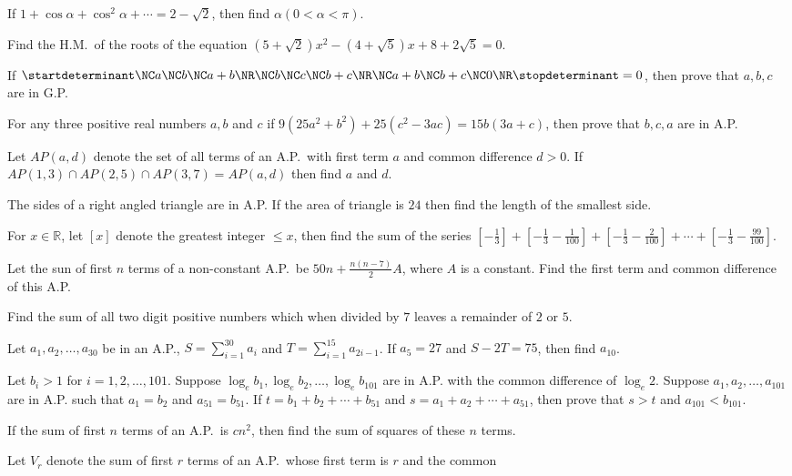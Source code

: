 \item If $1 + \cos\alpha + \cos^2\alpha + \cdots = 2 - \sqrt{2}$, then find $\alpha(0 < \alpha < \pi)$.
\item Find the H.M.\ of the roots of the equation $(5 + \sqrt{2})x^2 - (4 + \sqrt{5})x + 8 + 2\sqrt{5} = 0$.
\item If $\startdeterminant\NC a\NC b\NC a + b\NR\NC b\NC c\NC b + c\NR\NC a + b\NC b + c\NC
  0\NR\stopdeterminant = 0$, then prove that $a, b, c$ are in G.P.
\item For any three positive real numbers $a, b$ and $c$ if $9(25a^2 + b^2) + 25(c^2 - 3ac) = 15b(3a + c)$,
  then prove that $b, c, a$ are in A.P.
\item Let $AP(a, d)$ denote the set of all terms of an A.P.\ with first term $a$ and common difference $d >
  0$. If $AP(1, 3)\cap AP(2, 5)\cap AP(3, 7) = AP(a, d)$ then find $a$ and $d$.
\item The sides of a right angled triangle are in A.P. If the area of triangle is $24$ then find the length
  of the smallest side.
\item For $x\in\mathbb{R}$, let $[x]$ denote the greatest integer $\leq x$, then find the sum of the series
  $\left[-\frac{1}{3}\right] + \left[-\frac{1}{3} - \frac{1}{100}\right] + \left[-\frac{1}{3}
  - \frac{2}{100}\right] + \cdots + \left[-\frac{1}{3} - \frac{99}{100}\right]$.
\item Let the sun of first $n$ terms of a non-constant A.P.\ be $50n + \frac{n(n - 7)}{2}A$, where $A$ is a
  constant. Find the first term and common difference of this A.P.
\item Find the sum of all two digit positive numbers which when divided by $7$ leaves a remainder of $2$ or
  $5$.
\item Let $a_1, a_2, \ldots, a_{30}$ be in an A.P., $S = \displaystyle\sum_{i = 1}^{30}a_i$ and $T
  = \displaystyle\sum_{i = 1}^{15}a_{2i - 1}$. If $a_5 = 27$ and $S - 2T = 75$, then find $a_{10}$.
\item Let $b_i > 1$ for $i = 1, 2, \ldots, 101$. Suppose $\log_eb_1, \log_eb_2, \ldots, \log_eb_{101}$ are
  in A.P. with the common difference of $\log_e2$. Suppose $a_1, a_2, \ldots, a_{101}$ are in A.P. such that
  $a_1 = b_2$ and $a_{51} = b_{51}$. If $t = b_1 + b_2 + \cdots + b_{51}$ and $s = a_1 + a_2 + \cdots +
  a_{51}$, then prove that $s > t$ and $a_{101} < b_{101}$.
\item If the sum of first $n$ terms of an A.P.\ is $cn^2$, then find the sum of squares of these $n$ terms.
\item Let $V_r$ denote the sum of first $r$ terms of an A.P.\ whose first term is $r$ and the common
